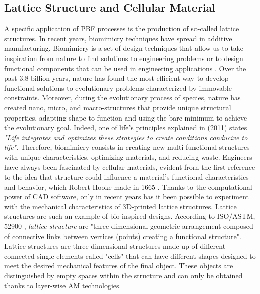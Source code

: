 \subsection{Lattice Structure and Cellular Material} \label{subsec:lattice}
A specific application of PBF processes is the production of so-called lattice structures. In recent years, biomimicry techniques have spread in additive manufacturing. Biomimicry is a set of design techniques that allow us to take inspiration from nature to find solutions to engineering problems or to design functional components that can be used in engineering applications \cite{pathak_biomimicry_2019, du_plessis_beautiful_2019}. Over the past 3.8 billion years, nature has found the most efficient way to develop functional solutions to evolutionary problems characterized by immovable constraints. Moreover, during the evolutionary process of species, nature has created nano, micro, and macro-structures that provide unique structural properties, adapting shape to function and using the bare minimum to achieve the evolutionary goal. Indeed, one of life's principles explained in \citeauthor{baumeister_biomimicry_2011} (2011) states \textit{"Life integrates and optimizes these strategies to create conditions conducive to life"}. Therefore, biomimicry consists in creating new multi-functional structures with unique characteristics, optimizing materials, and reducing waste. Engineers have always been fascinated by cellular materials, evident from the first reference to the idea that structure could influence a material's functional characteristics and behavior, which Robert Hooke made in 1665 \cite{l_gibson_cellular_2010}. Thanks to the computational power of CAD software, only in recent years has it been possible to experiment with the mechanical characteristics of 3D-printed lattice structures. Lattice structures are such an example of bio-inspired designs. According to ISO/ASTM, 52900 \cite{organization_isoastm_2015}, \emph{lattice structure} are "three-dimensional geometric arrangement composed of connective links between vertices (points) creating a functional structure". Lattice structures are three-dimensional structures made up of different connected single elements called "cells" that can have different shapes designed to meet the desired mechanical features of the final object. These objects are distinguished by empty spaces within the structure and can only be obtained thanks to layer-wise AM technologies. 
